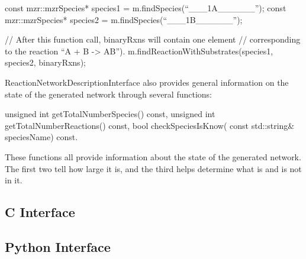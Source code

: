 const mzr::mzrSpecies* species1 = m.findSpecies(``___1A______'');
const mzr::mzrSpecies* species2 = m.findSpecies(``___1B______'');

// After this function call, binaryRxns will contain one element
// corresponding to the reaction ``A + B -> AB'').
m.findReactionWithSubstrates(species1, species2, binaryRxns);


ReactionNetworkDescriptionInterface also provides general information
on the state of the generated network through several functions:

unsigned int getTotalNumberSpecies() const, 
unsigned int getTotalNumberReactions() const,
bool checkSpeciesIsKnow( const std::string& speciesName) const.

These functions all provide information about the state of the
generated network.  The first two tell how large it is, and the third
helps determine what is and is not in it.  





\subsection{C Interface}
\subsection{Python Interface}



